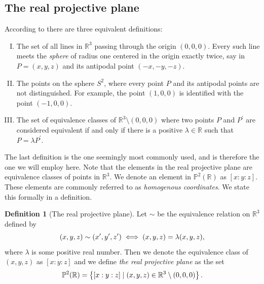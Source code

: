 \documentclass{article}
\theoremstyle{definition}
\newtheorem{defn}{Definition}
\theoremstyle{plain}
\newcommand{\proj}{\ensuremath{\mathbb{P}}} %
\newcommand{\R}{\ensuremath{\mathbb{R}}}    %
\newcommand{\projp}[3]{\ensuremath{[ #1 : #2 : #3 ]}}
\begin{document}
\subsection{The real projective plane}
According to \cite{Wik16} there are three equivalent definitions:

\begin{enumerate}[I.]
    \item\label{def:one} The set of all lines in $\R^3$ passing through the origin $\left( 0,
        0, 0 \right)$. Every such line meets the \emph{sphere} of radius one
        centered in the origin exactly twice, say in $P = (x, y, z)$ and its
        antipodal point $(-x, -y, -z)$.
    \item\label{def:two} The points on the sphere $S^2$, where every point $P$ and its
        antipodal points are not distinguished. For example, the point $(1, 0,
        0)$ is identified with the point $(-1, 0, 0)$.
    \item The set of equivalence classes of $\R^3 \setminus (0, 0, 0)$ where
        two points $P$ and $P^\prime$ are considered equivalent if and only if
        there is a positive $\lambda \in \R$ such that $P = \lambda P^\prime$.
\end{enumerate}

The last definition is the one seemingly most commonly used, and is therefore
the one we will employ here. Note that the elements in the real projective
plane are equivalence classes of points in $\R^3$. We denote an element in
$\proj^2(\R)$ as $\projp{x}{y}{z}$. These elements are commonly referred to as
\emph{homogenous coordinates}. We state this
formally in a definition.

\begin{defn}[The real projective plane]\index{$\proj^2(\R)$}
    Let $\sim$ be the equivalence relation on $\R^3$ defined by
    \begin{equation}
        \notag
        (x, y, z) \sim (x', y', z') \iff (x, y, z) = \lambda(x, y, z),
    \end{equation}
    where $\lambda$ is some positive real number. Then we denote the
    equivalence class of $(x, y, z)$ as $\projp{x}{y}{z}$ and we define
    \emph{the real projective plane} as the set
    \begin{equation}
        \notag
        \proj^2(\R) = \left\{ \projp{x}{y}{z} \mid (x, y, z) \in \R^3 \setminus
        (0, 0, 0) \right\}.
    \end{equation}
\end{defn}
\end{document}
